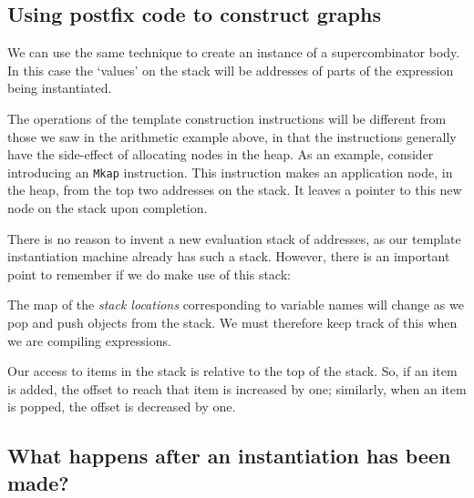 \subsection{Using postfix code to construct graphs}

We can use the same technique to create an instance of a
supercombinator body. In this case the `values' on the stack will be
addresses of parts of the expression being instantiated.

The operations of the template construction instructions will be
different from those we saw in the arithmetic example above, in that
the instructions generally have the side-effect of allocating nodes in
the heap. As an example, consider introducing an \mbox{\tt Mkap} instruction.
This instruction makes an application node, in the heap, from the top
two addresses on the stack. It leaves a pointer to this new node on
the stack upon completion.

There is no reason to invent a new evaluation stack of addresses, as
our template instantiation machine already has such a stack. However,
there is an important point to remember if we do make use of this
stack:
\begin{important}
The map of the {\em stack locations\/}
corresponding to variable names will change as we pop and push objects
from the stack. We must therefore keep track of this when we are
compiling expressions.
\end{important}
Our access to items in the stack is relative to the top of the stack.
So, if an item is added, the offset to reach that item is increased by
one; similarly, when an item is popped, the offset is decreased by one.

\subsection{What happens after an instantiation has been made?}

